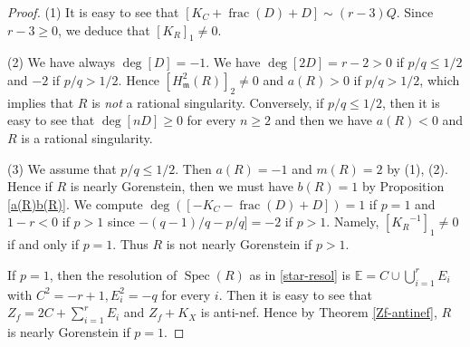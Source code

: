 \documentclass[12pt]{amsart}
\theoremstyle{definition}
\theoremstyle{remark}
\numberwithin{equation}{section}
\DeclareMathOperator{\Spec}{Spec}
\DeclareMathOperator{\FRC}{frac}
\newcommand{\m}{\mathfrak m}
\newcommand{\KiR}{{K_R}^{-1}}
\newcommand{\bbE}{\mathbb E}
\renewcommand{\:}{\colon}
\begin{document}
\begin{proof} 
(1) It is easy to see that $[K_C + \FRC(D) + D] \sim (r-3)Q$. Since 
$r-3\ge 0$, we deduce that $[K_R]_1\ne 0$. 
\par \vspace{1mm}
(2) We have always $\deg [D] = -1$.  We have $\deg [2D] = r-2>0$ if $p/q \le 1/2$ 
and $-2$ if $p/q > 1/2$. Hence $[H^2_{\m}(R)]_2 \ne 0$ and $a(R)>0$ if $p/q > 1/2$, which 
implies that $R$ is {\em not} a rational singularity. Conversely, if $p/q \le 1/2$, then it is 
easy to see that $\deg [nD] \ge 0$ for every $n\ge 2$ and then we have $a(R)<0$ and $R$ is   
a rational singularity. 
\par \vspace{1mm}
(3) We assume that $p/q \le 1/2$. Then $a(R)=-1$ and $m(R)=2$ by (1), (2). 
Hence if $R$ is nearly Gorenstein, then we must have $b(R)=1$ by Proposition \ref{a(R)b(R)}.
We compute  $\deg ([-K_C -\FRC(D) + D ]) = 1$ if $p=1$ and $1 - r <0$ if $p > 1$ since 
$-(q-1)/q - p/q] = -2$ if $p>1$. Namely, $[\KiR]_1\ne 0$ if and only if $p=1$. 
Thus $R$ is not nearly Gorenstein if $p>1$. 
\par 
If $p=1$, then the resolution of $\Spec(R)$ as in 
\ref{star-resol} is $\bbE = C \cup \bigcup_{i=1}^r E_i$ with $C^2 = -r+1, E_i^2=-q$ 
for every $i$. Then it is easy to see that $Z_f = 2C + \sum_{i=1}^r E_i$ and 
$Z_f + K_X$ is anti-nef. Hence by Theorem \ref{Zf-antinef}, 
$R$ is nearly Gorenstein if $p=1$. 


\end{proof}
\end{document}
